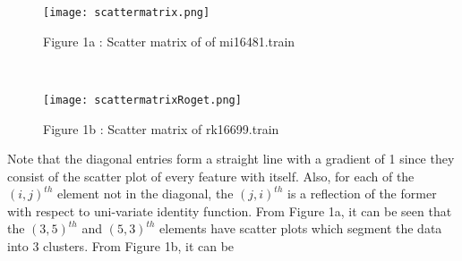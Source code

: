 \begin{wrapfigure}{}{\textwidth}
   \begin{center}
       \texttt{[image: scattermatrix.png]}
           \caption{Figure 1a : Scatter matrix of of mi16481.train}
            \end{center}
            \end{wrapfigure}
            \\
            \begin{wrapfigure}{}{\textwidth}
              \begin{center}
                  \texttt{[image: scattermatrixRoget.png]}
                      \caption{Figure 1b : Scatter matrix of rk16699.train}
                       \end{center}
                       \end{wrapfigure}
                       Note that the diagonal entries form a straight line with a gradient of 1 since they consist of the scatter plot of every feature with itself. Also, for each of the $(i,j)^{th}$ element not in the diagonal, the $(j,i)^{th}$ is a reflection of the former with respect to uni-variate identity function. From Figure 1a, it can be seen that the $(3,5)^{th}$ and $(5,3)^{th}$ elements have scatter plots which segment the data into 3 clusters. From Figure 1b, it can be
